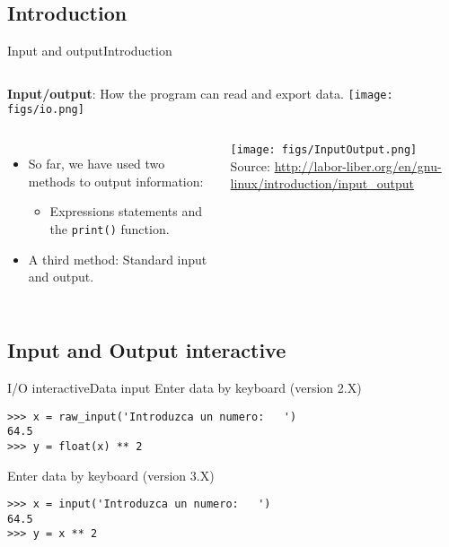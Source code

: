 \documentclass[10pt,compress]{beamer} %
\begin{document}
\subsection{Introduction}
\begin{frame}[fragile]{Input and output}{Introduction}
    \begin{columns}
			\textbf{Input/output}: How the program can read and export data.
  		\texttt{[image: figs/io.png]}\\
	\end{columns}

    \begin{columns}
	\begin{itemize}
		\item So far, we have used two methods to output information:
			\begin{itemize}
			\item Expressions statements and the \texttt{print()} function.
			\end{itemize}
		\item A third method: Standard input and output.\\
	\end{itemize}
  			\texttt{[image: figs/InputOutput.png]}\\
			\centering \tiny{Source: \url{http://labor-liber.org/en/gnu-linux/introduction/input\_output}}
	\end{columns}
\end{frame}

\subsection{Input and Output interactive}


\begin{frame}[fragile]{I/O interactive}{Data input}
Enter data  by keyboard  (version 2.X)
\begin{verbatim}
>>> x = raw_input('Introduzca un numero:   ')
64.5
>>> y = float(x) ** 2
\end{verbatim}	
	Enter data  by keyboard  (version 3.X)
\begin{verbatim}	
>>> x = input('Introduzca un numero:   ')
64.5
>>> y = x ** 2
\end{verbatim}
\end{frame}
\end{document}

